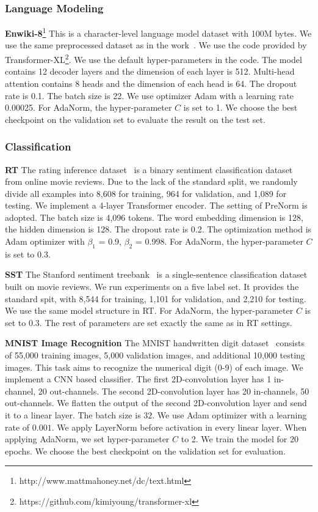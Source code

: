 \documentclass{article}
\begin{document}
\subsubsection{Language Modeling}
\textbf{Enwiki-8}\footnote{http://www.mattmahoney.net/dc/text.html} This is a character-level language model dataset with 100M bytes.  We use the same preprocessed dataset as in the work~\citep{DBLP:conf/iclr/ChungAB17}.  We use the code provided by Transformer-XL\footnote{https://github.com/kimiyoung/transformer-xl }. We use the default hyper-parameters in the code. The model contains 12 decoder layers and the dimension of each layer is 512. Multi-head attention contains 8 heads and the dimension of each head is 64. The dropout rate is 0.1. The batch size is 22. We use optimizer Adam  with a learning rate 0.00025.  For AdaNorm, the hyper-parameter $C$ is set to 1. We choose the best checkpoint on the validation set to evaluate the result on the test set.

\subsubsection{Classification}





\textbf{RT} The rating inference dataset~\citep{PangLee} is a binary  sentiment classification dataset from online movie reviews. Due to the lack of the standard split, we randomly divide all examples into 8,608 for training, 964 for validation, and 1,089 for testing. We implement a 4-layer Transformer encoder. The setting of PreNorm is adopted. The batch size is 4,096 tokens. The word embedding dimension is 128,  the hidden dimension is 128. The dropout rate is 0.2.   The optimization method is Adam optimizer  with $\beta_1$ = 0.9, $\beta_2$  = 0.998. For AdaNorm, the hyper-parameter $C$ is set to 0.3. 

\textbf{SST} The Stanford sentiment treebank~\citep{socher2013recursive} is a single-sentence classification dataset built on movie reviews.  We run experiments on a five label set. It provides the standard spit, with 8,544 for training, 1,101 for validation, and 2,210 for testing. We use the same model structure in RT. For AdaNorm, the hyper-parameter $C$ is set to 0.3. The rest of parameters are set exactly the same as in RT settings. 

\textbf{MNIST Image Recognition} \quad The MNIST handwritten digit dataset~\citep{lecun1998gradient} consists of 55,000 training images, 5,000 validation images, and additional 10,000 testing images. This task aims to recognize the numerical digit (0-9) of each image. We implement a CNN based classifier. The first 2D-convolution layer has 1 in-channel, 20 out-channels. The second 2D-convolution layer has 20 in-channels, 50 out-channels. We flatten the output of the second 2D-convolution layer and send it to a linear layer. The batch size is  $32$. We use Adam optimizer with a learning rate of $0.001$. We apply LayerNorm before activation in every linear layer. When applying AdaNorm, we set hyper-parameter $C$ to 2. We train the model for $20$ epochs. We choose the best checkpoint on the validation set for evaluation.
\end{document}
